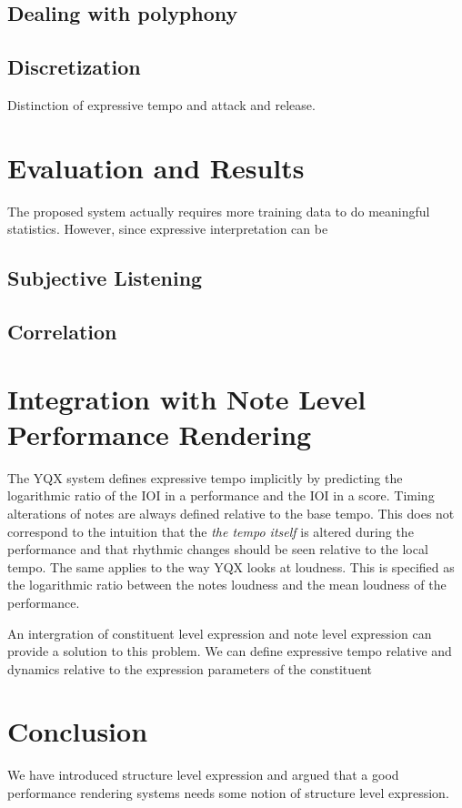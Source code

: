 \documentclass[a4paper,10pt]{article}
\begin{document}
\subsection{Dealing with polyphony}
\subsection{Discretization}

Distinction of expressive tempo and attack and release.

\section{Evaluation and Results}
The proposed system actually requires more training data to do meaningful statistics. However, since expressive interpretation can be 
\subsection{Subjective Listening}
\subsection{Correlation}
\section{Integration with Note Level Performance Rendering}

The YQX system defines expressive tempo implicitly by predicting the logarithmic ratio of the IOI in a performance and the IOI in a score. Timing alterations of notes are always defined relative to the base tempo. This does not correspond to the intuition that the \textit{the tempo itself} is altered during the performance and that rhythmic changes should be seen relative to the local tempo. The same applies to the way YQX looks at loudness. This is specified as the logarithmic ratio between the notes loudness and the mean loudness of the performance. 

An intergration of constituent level expression and note level expression can provide a solution to this problem. We can define expressive tempo relative and dynamics relative to the expression parameters of the constituent

\section{Conclusion}
We have introduced structure level expression and argued that a good performance rendering systems needs some notion of structure level expression. 
\end{document}
